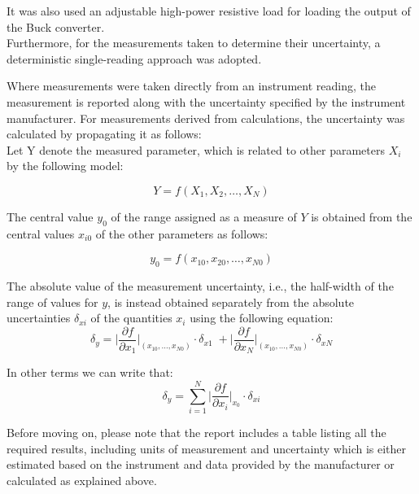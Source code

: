 \documentclass[../main.tex]{subfiles}
\begin{document}
It was also used an adjustable high-power resistive load for loading the output of the Buck converter.\\


Furthermore, for the measurements taken to determine their uncertainty, a deterministic single-reading approach was adopted. 

Where measurements were taken directly from an instrument reading, the measurement is reported along with the uncertainty specified by the instrument manufacturer. For measurements derived from calculations, the uncertainty was calculated by propagating it as follows:\\

Let Y denote the measured parameter, which is related to other parameters $X_i$ by the following model:

\begin{equation*}
	Y = f(X_1,X_2,\dots, X_N)
\end{equation*}

The central value $y_0$ of the range assigned as a measure of $Y$ is obtained from the central values $x_{i0}$ of the other parameters as follows:

\begin{equation*}
	y_0 = f(x_10, x_20, \dots, x_{N0})
\end{equation*}

The absolute value of the measurement uncertainty, i.e., the half-width of the range of values for $y$, is instead obtained separately from the absolute uncertainties $\delta_{xi}$ of the quantities $x_i$ using the following equation:\\

\begin{equation*}
	\delta_y = \bigg|  \frac{\partial f}{\partial x_1}   \bigg|_{(x_{10},\dots,x_{N0})} \cdot \delta_{x1} \; + \bigg| \frac{\partial f}{\partial x_N}   \bigg|_{(x_{10},\dots,x_{N0})} \cdot \delta_{xN} 
\end{equation*}
\vspace{0.5cm}

In other terms we can write that:\\

\begin{equation*}
	\delta_y = \sum_{i = 1}^N  \bigg| \frac{\partial f}{\partial x_i} \bigg|_{x_0} \cdot \delta_{xi}	
\end{equation*}
\vspace{0.5cm}

Before moving on, please note that the report includes a table listing all the required results, including units of measurement and uncertainty which is either estimated based on the instrument and data provided by the manufacturer or calculated as explained above.
\end{document}
